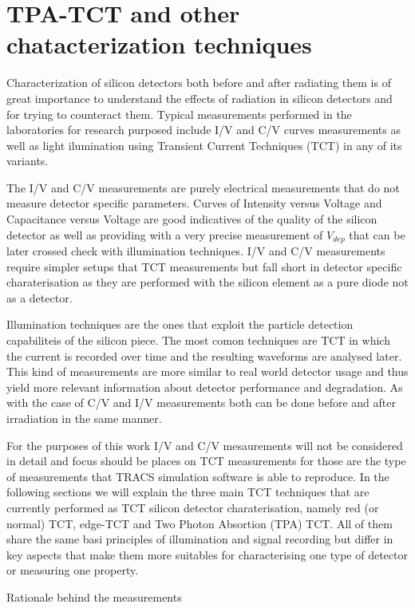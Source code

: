 \chapter{TPA-TCT and other chatacterization techniques}

Characterization of silicon detectors both before and after radiating them is of great importance to understand the effects of radiation in silicon detectors and for trying to counteract them. Typical measurements performed in the laboratories for research purposed include I/V and C/V curves measurements as well as light ilumination using Transient Current Techniques (TCT) in any of its variants. 

The I/V and C/V measurements are purely electrical measurements that do not measure detector specific parameters. Curves of Intensity versus Voltage and Capacitance versus Voltage are good indicatives of the quality of the silicon detector as well as providing with a very precise measurement of $V_{dep}$ that can be later crossed check with illumination techniques. I/V and C/V measurements require simpler setups that TCT measurements but fall short in detector specific charaterisation as they are performed with the silicon element as a pure diode not as a detector.

Illumination techniques are the ones that exploit the particle detection capabiliteis of the silicon piece. The most comon techniques are TCT in which the current is recorded over time and the resulting waveforms are analysed later. This kind of measurements are more similar to real world detector usage and thus yield more relevant information about detector performance and degradation. As with the case of C/V and I/V measurements both can be done before and after irradiation in the same manner.

For the purposes of this work I/V and C/V mesaurements will not be considered in detail and focus should be places on TCT measurements for those are the type of measurements that TRACS simulation software is able to reproduce. In the following sections we will explain the three main TCT techniques that are currently performed as TCT silicon detector charaterisation, namely red (or normal) TCT, edge-TCT and Two Photon Absortion (TPA) TCT. All of them share the same basi principles of illumination and signal recording but differ in key aspects that make them more suitables for characterising one type of detector or measuring one property. 

Rationale behind the measurements

